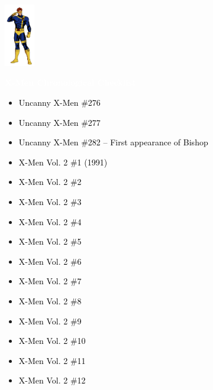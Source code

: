 \documentclass[12pt]{article}
\newcommand{\checkbox}{\raisebox{0.0ex}{\fbox{\rule{0ex}{1.5ex} \rule{1.5ex}{0ex}}}}
\begin{document}
\begin{center}
    \vspace*{2cm}
    \includegraphics[width=0.1\textwidth]{cyclops.png}
    \vspace{0.3cm}

    {\Huge \textbf{\textcolor{white}{X-Men Chronological Checklist}}}
\end{center}

\vspace{0.3cm}
\noindent
\begin{tcolorbox}[
  colback=white!95!gray,
  colframe=black,
  width=\textwidth,
  arc=4mm,
  auto outer arc,
  boxrule=0.8pt,
  left=8pt,right=8pt,top=8pt,bottom=8pt
]
\begin{itemize}[left=0pt,label={\checkbox}]
    \item \textcolor{black}{Uncanny X-Men \#276}
    \item \textcolor{black}{Uncanny X-Men \#277}
    \item \textcolor{black}{Uncanny X-Men \#282 – First appearance of Bishop}
    \item \textcolor{black}{X-Men Vol. 2 \#1 (1991)}
    \item \textcolor{black}{X-Men Vol. 2 \#2}
    \item \textcolor{black}{X-Men Vol. 2 \#3}
    \item \textcolor{black}{X-Men Vol. 2 \#4}
    \item \textcolor{black}{X-Men Vol. 2 \#5}
    \item \textcolor{black}{X-Men Vol. 2 \#6}
    \item \textcolor{black}{X-Men Vol. 2 \#7}
    \item \textcolor{black}{X-Men Vol. 2 \#8}
    \item \textcolor{black}{X-Men Vol. 2 \#9}
    \item \textcolor{black}{X-Men Vol. 2 \#10}
    \item \textcolor{black}{X-Men Vol. 2 \#11}
    \item \textcolor{black}{X-Men Vol. 2 \#12}
\end{itemize}
\end{tcolorbox}
\end{document}
